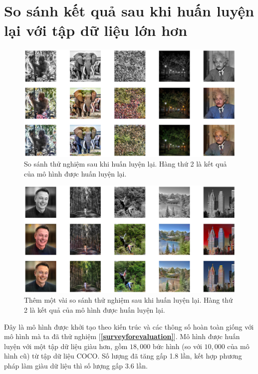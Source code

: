 \documentclass[a4paper, 12pt]{report}
\begin{document}
\section{So sánh kết quả sau khi huấn luyện lại với tập dữ liệu lớn hơn}\label{enhance_experiments}

\begin{figure}[!h]
\captionsetup{width=0.8\textwidth}
\centering
\includegraphics[width=15cm]{images/enhance.png}
\caption{So sánh thử nghiệm sau khi huấn luyện lại. Hàng thứ 2 là kết quả của mô hình được huấn luyện lại.}
\label{fig:enhance1}
\end{figure}

\begin{figure}[!h]
\captionsetup{width=0.8\textwidth}
\centering
\includegraphics[width=15cm]{images/enhance2.png}
\caption{Thêm một vài so sánh thử nghiệm sau khi huấn luyện lại. Hàng thứ 2 là kết quả của mô hình được huấn luyện lại.}
\label{fig:enhance2}
\end{figure}

Đây là mô hình được khởi tạo theo kiến trúc và các thông số hoàn toàn giống với mô hình mà ta đã thử nghiệm [\textbf{\ref{surveyforevaluation}}].
Mô hình được huấn luyện với một tập dữ liệu giàu hơn, gồm $18,000$ bức hình (so với $10,000$ của mô hình cũ) từ tập dữ liệu COCO.
Số lượng đã tăng gấp 1.8 lần, kết hợp phương pháp làm giàu dữ liệu thì số lượng gấp 3.6 lần.\vspace{5pt}
\end{document}
